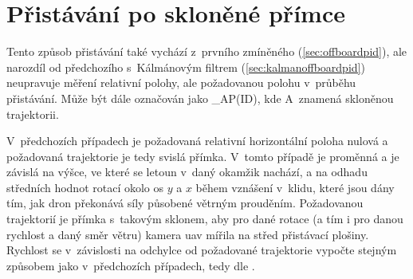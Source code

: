     \section{Přistávání po skloněné přímce} \label{sec:offboardpidangle}
        Tento způsob přistávání také vychází z~prvního zmíněného (\cref{sec:offboardpid}), ale narozdíl od předchozího s~Kálmánovým filtrem (\cref{sec:kalmanoffboardpid}) neupravuje měření relativní polohy, ale požadovanou polohu v~průběhu přistávání. Může být dále označován jako \_AP(ID), kde A~znamená skloněnou trajektorii.
        
        V~předchozích případech je požadovaná relativní horizontální poloha nulová a požadovaná trajektorie je tedy svislá přímka. V~tomto případě je proměnná a je závislá na výšce, ve které se letoun v~daný okamžik nachází, a na odhadu středních hodnot rotací okolo os $y$ a $x$ během vznášení v~klidu, které jsou dány tím, jak dron překonává síly působené větrným prouděním. Požadovanou trajektorií je přímka s~takovým sklonem, aby pro dané rotace (a tím i pro danou rychlost a daný směr větru) kamera \acrshort{uav} mířila na střed přistávací plošiny. Rychlost se v~závislosti na odchylce od požadované trajektorie vypočte stejným způsobem jako v~předchozích případech, tedy dle .

